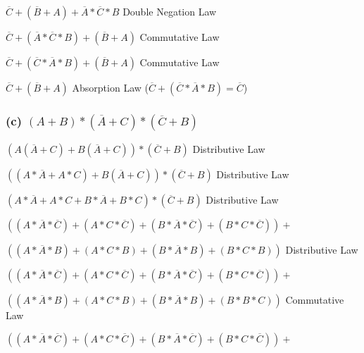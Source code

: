 \documentclass{article}
\newcommand{\boxedanswer}[1]{%

    \fbox{\large\textbf{#1}}%
}
\begin{document}
    $\overline{C} + (\overline{B} + A) + \overline{A} * \overline{C} * B$ \hspace*{0.1in} Double Negation Law

    $\overline{C} + (\overline{A} * \overline{C} * B)+  (\overline{B} + A)  $ \hspace*{0.1in} Commutative Law

    $\overline{C} + (\overline{C} * \overline{A} * B)+  (\overline{B} + A)  $ \hspace*{0.1in} Commutative Law

    $\overline{C} +  (\overline{B} + A)  $ \hspace*{0.1in} Absorption Law ($\overline{C} + (\overline{C} * \overline{A} * B) = \overline{C}$)

    \vspace*{0.1in}

    \boxedanswer{$\overline{C} + \overline{B} + A$}

    \newpage

    \subsubsection*{(c) $(A+B) * (\overline{A} + C) * (\overline{C} + B)$}

    $(A(\overline{A} + C) + B(\overline{A} + C))* (\overline{C} + B)$ \hspace*{0.1in} Distributive Law

    $((A*\overline{A} + A*C)+B(\overline{A} + C))* (\overline{C} + B)$ \hspace*{0.1in} Distributive Law

    $(A*\overline{A} + A*C+ B*\overline{A} + B*C)* (\overline{C} + B)$ \hspace*{0.1in} Distributive Law

    $((A*\overline{A}*\overline{C}) + (A*C*\overline{C})+ (B*\overline{A}*\overline{C}) + (B*C*\overline{C})) + $
    
    $((A*\overline{A}*B) + (A*C*B)+ (B*\overline{A}*B) + (B*C*B))$ \hspace*{0.1in} Distributive Law

    $((A*\overline{A}*\overline{C}) + (A*C*\overline{C})+ (B*\overline{A}*\overline{C}) + (B*C*\overline{C})) + $
    
    $((A*\overline{A}*B) + (A*C*B)+ (B*\overline{A}*B) + (B*B*C))$ \hspace*{0.1in} Commutative Law

    $((A*\overline{A}*\overline{C}) + (A*C*\overline{C})+ (B*\overline{A}*\overline{C}) + (B*C*\overline{C})) + $
    
\end{document}
